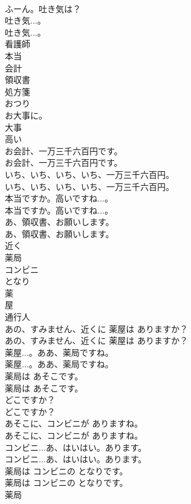 \documentclass[8pt]{extreport}
\begin{document}
\begin{CJK}{UTF8}{min}
\\	ふーん。吐き気は？ 
\\	吐き気...。	
\\	吐き気...。 
\\	看護師
\\	本当
\\	会計
\\	領収書
\\	処方箋
\\	おつり
\\	お大事に。
\\	大事
\\	高い
\\	お会計、一万三千六百円です。	
\\	お会計、一万三千六百円です。 
\\	いち、いち、いち、いち、一万三千六百円。	
\\	いち、いち、いち、いち、一万三千六百円。 
\\	本当ですか。高いですね...。	
\\	本当ですか。高いですね...。 
\\	あ、領収書、お願いします。	
\\	あ、領収書、お願いします。 
\\	近く
\\	薬局
\\	コンビニ
\\	となり
\\	薬
\\	屋
\\	通行人
\\	あの、すみません、近くに 薬屋は ありますか？	
\\	あの、すみません、近くに 薬屋は ありますか？ 
\\	薬屋...。ああ、薬局ですね。	
\\	薬屋...。ああ、薬局ですね。 
\\	薬局は あそこです。	
\\	薬局は あそこです。 
\\	どこですか？	
\\	どこですか？ 
\\	あそこに、コンビニが ありますね。	
\\	あそこに、コンビニが ありますね。 
\\	コンビニ...あ、はいはい。あります。	
\\	コンビニ...あ、はいはい。あります。 
\\	薬局は コンビニの となりです。	
\\	薬局は コンビニの となりです。 
\\	薬局

\end{CJK}
\end{document}
